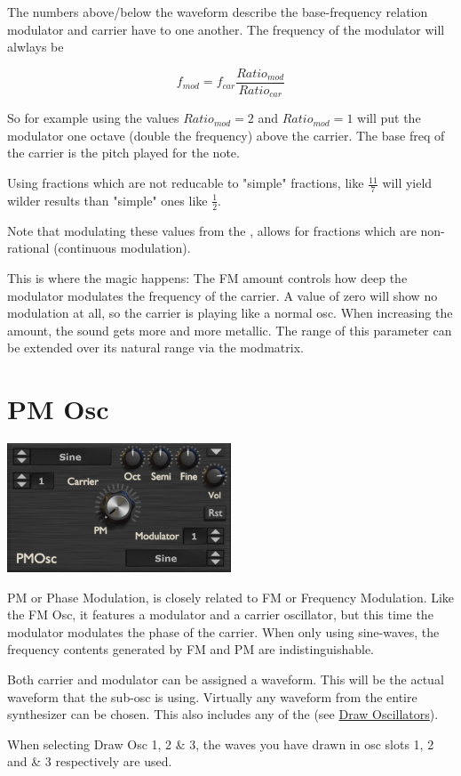 {The numbers above/below the waveform describe the base-frequency relation modulator and carrier have to one another. The frequency of the modulator will alwlays be

\begin{equation}
    f_{mod} = f_{car} \frac{Ratio_{mod}}{Ratio_{car}}
\end{equation}

So for example using the values $Ratio_{mod} = 2$ and $Ratio_{mod} = 1$ will put the modulator one octave (double the frequency) above the carrier. The base freq of the carrier is the pitch played for the note.

Using fractions which are not reducable to "simple" fractions, like $\frac{11}{7}$ will yield wilder results than "simple" ones like $\frac{1}{2}$.

Note that modulating these values from the \modmatrix, allows for fractions which are non-rational (continuous modulation).}

{This is where the magic happens: The FM amount controls how deep the modulator modulates the frequency of the carrier. A value of zero will show no modulation at all, so the carrier is playing like a normal osc. When increasing the amount, the sound gets more and more metallic. The range of this parameter can be extended over its natural range via the modmatrix.}

\section{PM Osc}
\begin{center}
    \includegraphics[width=0.5\textwidth]{graphics/pm_osc.png}
\end{center}
PM or Phase Modulation, is closely related to FM or Frequency Modulation. Like the FM Osc, it features a modulator and a carrier oscillator, but this time the modulator modulates the phase of the carrier. When only using sine-waves, the frequency contents generated by FM and PM are indistinguishable.

{Both carrier and modulator can be assigned a waveform. This will be the actual waveform that the sub-osc is using. Virtually any waveform from the entire synthesizer can be chosen. This also includes any of the (see \hyperref[wavedraw]{Draw Oscillators}).

When selecting  Draw Osc 1, 2 \& 3, the waves you have drawn in osc slots 1, 2 and \& 3 respectively are used.}

